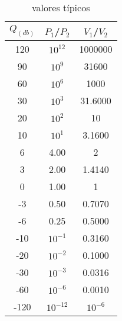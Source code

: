 \begin{table}[ht]
\centering
\begin{tabular}{|c|c|c|}
\hline
$Q_{(db)}$ & $P_1$/$P_2$ & $V_1$/$V_2$\\
\hline
120 & $10^{12}$ & 1000000\\
90 & $10^{9}$ & 31600\\
60 & $10^{6}$ & 1000\\
30 & $10^{3}$ & 31.6000\\
20 & $10^{2}$ & 10\\
10 & $10^{1}$ & 3.1600\\
6 & 4.00 & 2\\
3 & 2.00 & 1.4140\\
0 & 1.00 & 1\\
-3 & 0.50 & 0.7070\\
-6 & 0.25 & 0.5000\\
-10 & $10^{-1}$ & 0.3160\\
-20 & $10^{-2}$ & 0.1000\\
-30 & $10^{-3}$ & 0.0316\\
-60 & $10^{-6}$ & 0.0010\\
-120 & $10^{-12}$ & $10^{-6}$\\
\hline
\end{tabular}
\caption{valores típicos \cite{bel1}}
\end{table}
